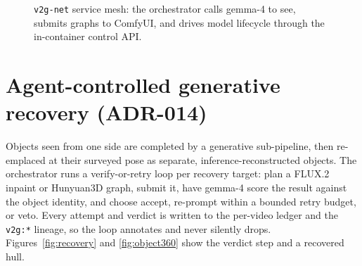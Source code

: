 \documentclass[a4paper,11pt]{report}
\newcommand{\code}[1]{\texttt{#1}}
\begin{document}
\begin{figure}[h]
\centering
{}
\caption{\code{v2g-net} service mesh: the orchestrator calls gemma-4 to see, submits graphs to ComfyUI, and
drives model lifecycle through the in-container control API.}\label{fig:mesh}
\end{figure}

\section{Agent-controlled generative recovery (ADR-014)}
Objects seen from one side are completed by a generative sub-pipeline, then re-emplaced at their surveyed
pose as separate, inference-reconstructed objects. The orchestrator runs a verify-or-retry loop per
recovery target: plan a FLUX.2 inpaint or Hunyuan3D graph, submit it, have gemma-4 score the result against
the object identity, and choose accept, re-prompt within a bounded retry budget, or veto. Every attempt and
verdict is written to the per-video ledger and the \code{v2g:*} lineage, so the loop annotates and never
silently drops. Figures~\ref{fig:recovery} and \ref{fig:object360} show the verdict step and a recovered
hull.
\end{document}
